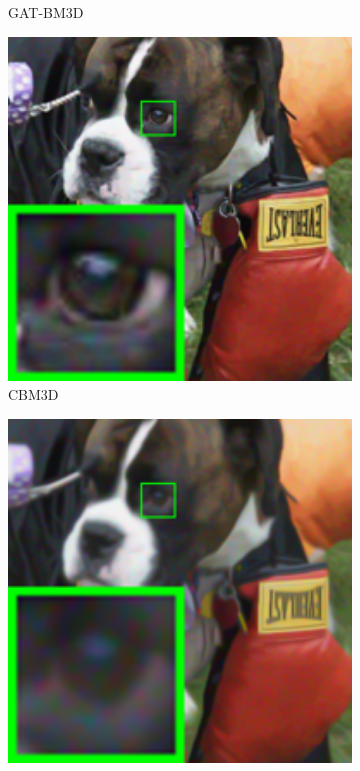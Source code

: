 \begin{figure}
\begin{subfigure}[t]{0.19\textwidth}
		\caption{GAT-BM3D}
    \end{subfigure}
    \hfill
    \begin{subfigure}[t]{0.19\textwidth}
        \centering
        \includegraphics[width=1\textwidth]{images/guided/resize_br_BM3D_dog.png}
\caption{CBM3D}
    \end{subfigure}
    \hfill
    \begin{subfigure}[t]{0.19\textwidth}
        \centering
        \includegraphics[width=1\textwidth]{images/guided/resize_br_WNNM_dog.png}

\end{subfigure}
\end{figure}
